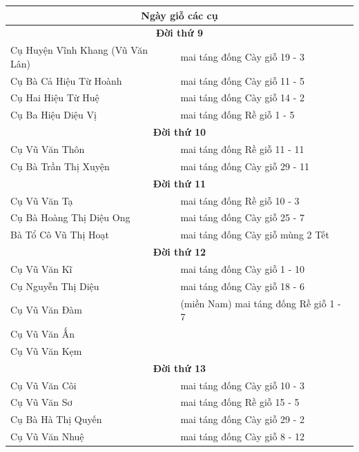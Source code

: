 \documentclass[11pt]{article}
\begin{document}
\renewcommand{\arraystretch}{1.15} %

\begin{longtable}{|p{}|p{}|}

\hline

\multicolumn{2}{|c|}{\textbf{Ngày giỗ các cụ}} \\ \hline

\multicolumn{2}{|c|}{\textbf{Đời thứ 9}} \\ \hline
Cụ Huyện Vĩnh Khang (Vũ Văn Lân) & mai táng đống Cày giỗ 19 - 3 \\ \hline
Cụ Bà Cả Hiệu Từ Hoành & mai táng đống Cày giỗ 11 - 5 \\ \hline
Cụ Hai Hiệu Từ Huệ & mai táng đống Cày giỗ 14 - 2 \\ \hline
Cụ Ba Hiệu Diệu Vị & mai táng đống Rề giỗ 1 - 5 \\ \hline

\multicolumn{2}{|c|}{\textbf{Đời thứ 10}} \\ \hline
Cụ Vũ Văn Thôn & mai táng đống Rề giỗ 11 - 11 \\ \hline
Cụ Bà Trần Thị Xuyện & mai táng đống Cày giỗ 29 - 11 \\ \hline

\multicolumn{2}{|c|}{\textbf{Đời thứ 11}} \\ \hline
Cụ Vũ Văn Tạ & mai táng đống Rề giỗ 10 - 3 \\ \hline
Cụ Bà Hoàng Thị Diệu Ong & mai táng đống Cày giỗ 25 - 7 \\ \hline
Bà Tổ Cô Vũ Thị Hoạt & mai táng đống Cày giỗ mùng 2 Tết \\ \hline

\multicolumn{2}{|c|}{\textbf{Đời thứ 12}} \\ \hline
Cụ Vũ Văn Kĩ & mai táng đống Cày giỗ 1 - 10 \\ \hline
Cụ Nguyễn Thị Diệu & mai táng đống Cày giỗ 18 - 6 \\ \hline
Cụ Vũ Văn Đàm & (miền Nam) mai táng đống Rề giỗ 1 - 7 \\ \hline
Cụ Vũ Văn Ấn & \\ \hline
Cụ Vũ Văn Kẹm & \\ \hline

\multicolumn{2}{|c|}{\textbf{Đời thứ 13}} \\ \hline
Cụ Vũ Văn Côi & mai táng đống Cày giỗ 10 - 3 \\ \hline
Cụ Vũ Văn Sơ & mai táng đống Rề giỗ 15 - 5 \\ \hline
Cụ Bà Hà Thị Quyến & mai táng đống Cày giỗ 29 - 2 \\ \hline
Cụ Vũ Văn Nhuệ & mai táng đống Cày giỗ 8 - 12 \\ \hline


\end{longtable}
\end{document}
